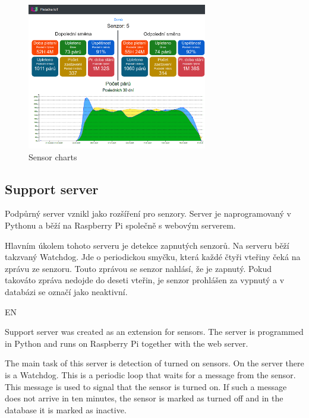 \documentclass[12pt, a4paper]{article}
\begin{document}
\begin{figure}[t]
    \centering
    \includegraphics[width=0.7\textwidth]{img/prehled.png}
    \caption{Sensor charts}
    \label{fig:webSenzory}
\end{figure}


\subsection*{Support server}
Podpůrný server vznikl jako rozšíření pro senzory.
Server je naprogramovaný v Pythonu a běží na Raspberry Pi společně s webovým serverem.\newline

Hlavním úkolem tohoto serveru je detekce zapnutých senzorů.
Na serveru běží takzvaný Watchdog.
Jde o periodickou smyčku, která každé čtyři vteřiny čeká na zprávu ze senzoru.
Touto zprávou se senzor nahlásí, že je zapnutý. Pokud takováto zpráva nedojde do deseti vteřin, je senzor prohlášen za vypnutý a v databázi se označí jako neaktivní.

EN

Support server was created as an extension for sensors.
The server is programmed in Python and runs on Raspberry Pi together with the web server.\newline

The main task of this server is detection of turned on sensors.
On the server there is a Watchdog.
This is a periodic loop that waits for a message from the sensor.
This message is used to signal that the sensor is turned on.
If such a message does not arrive in ten minutes, the sensor is marked as turned off and in the database it is marked as inactive.


\end{document}
